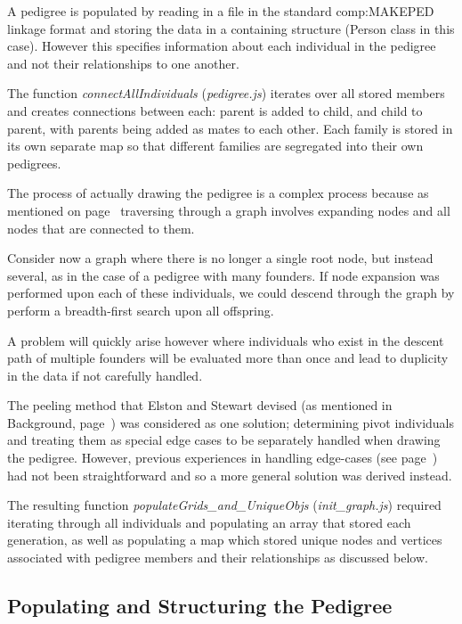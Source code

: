 A pedigree is populated by reading in a file in the standard \gls{comp:MAKEPED} linkage format and storing the data in a containing structure (Person class in this case). However this specifies information about each individual in the pedigree and not their relationships to one another.

The function \textit{connectAllIndividuals} (\textit{pedigree.js}) iterates over all stored members and creates connections between each: parent is added to child, and child to parent, with parents being added as mates to each other. Each family is stored in its own separate map so that different families are segregated into their own pedigrees. 

The process of actually drawing the pedigree is a complex process because as mentioned on page~\pageref{ref:haplo:graphtrav} traversing through a graph involves expanding nodes and all nodes that are connected to them.

Consider now a graph where there is no longer a single root node, but instead several, as in the case of a pedigree with many founders. If node expansion was performed upon each of these individuals, we could descend through the graph by perform a breadth-first search upon all offspring. 

A problem will quickly arise however where individuals who exist in the descent path of multiple founders will be evaluated more than once and lead to duplicity in the data if not carefully handled.

The peeling method that Elston and Stewart devised (as mentioned in Background, page~\pageref{ref:back:els})  was considered as one solution; determining pivot individuals and treating them as special edge cases to be separately handled when drawing the pedigree. However, previous experiences in handling edge-cases (see page~\pageref{ref:haplo:eventdiscuss}) had not been straightforward and so a more general solution was derived instead.

The resulting function \textit{populateGrids\_and\_UniqueObjs} (\textit{init\_graph.js}) required iterating through all individuals and populating an array that stored each generation, as well as populating a map which stored unique nodes and vertices associated with pedigree members and their relationships as discussed below.


\subsection{Populating and Structuring the Pedigree}


